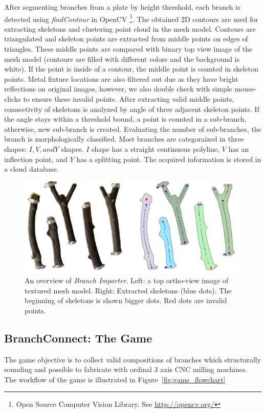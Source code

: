 After segmenting branches from a plate by height threshold, each branch is detected using \textit{findContour} in OpenCV \footnote{Open Source Computer Vision Library. See \url{http://opencv.org/} }.
The obtained 2D contours are used for extracting skeletons and clustering point cloud in the mesh model.
Contours are triangulated and skeleton points are extracted from middle points on edges of triangles.
These middle points are compared with binary top view image of the mesh model (contours are filled with different colors and the background is white).
If the point is inside of a contour, the middle point is counted in skeleton points.
Metal fixture locations are also filtered out due as they have bright reflections on original images, however, we also double check with simple mouse-clicks to ensure these invalid points.
After extracting valid middle points, connectivity of skeletons is analyzed by angle of three adjacent skeleton points.
If the angle stays within a threshold bound, a point is counted in a sub-branch, otherwise, new sub-branch is created.
Evaluating the number of sub-branches, the branch is morphologically classified.
Most branches are categoraized in three shapes:  $I, V, and Y$ shapes.
$I$ shape has a straight continuous polyline, $V$ has an inflection point, and $Y$ has a splitting point.
The acquired information is stored in a cloud database.

\begin{figure}[ht]
  \includegraphics[width = 0.4\paperwidth]{images/importer/importer.png}
  \caption{An overview of \textit{Branch Importer}. Left: a top ortho-view image of textured mesh model. Right: Extracted skeletons (blue dots). The beginning of skeletons is shown bigger dots. Red dots are invalid points. }
  \label{fig:skeleton}
\end{figure}




\subsection{BranchConnect: The Game}
The game objective is to collect valid compositions of branches which structurally sounding and possible to fabricate with ordinal 3 axis CNC milling machines.
The workflow of the game is illustrated in Figure~\ref{fig:game_flowchart}


